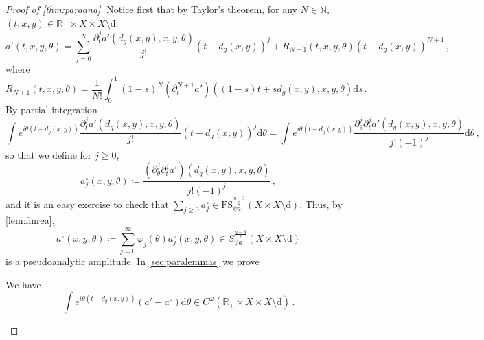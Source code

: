 \documentclass[
	fontsize=11pt, 
	twoside=false, 
	abstract=true, 
	a4paper,
]{scrartcl}
\newcommand{\RR}{\mathbb{R}}
\newcommand{\dd}{\mathrm{d}}
\newcommand{\del}{\partial}
\begin{document}
\begin{proof}[Proof of \cref{thm:paraana}]
	Notice first that by Taylor's theorem, for any $N\in\mathbb{N}$, $(t,x,y)\in \RR_+\times X\times X\setminus \mathrm{d}$, 
	\begin{equation}\label{eq:arterm}
		a'(t,x,y,\theta)%
		= %
		\sum_{j=0}^N\frac{\del_t^j a'(d_g(x,y),x,y,\theta)}{j!}(t-d_g(x,y))^j + R_{N+1}(t,x,y,\theta)(t-d_g(x,y))^{N+1}\,,%
	\end{equation}
	where
	\begin{equation}\label{eq:rterm}
		R_{N+1}(t,x,y,\theta) = \frac{1}{N!}\int_0^1 (1-s)^N (\del_t^{N+1} a')((1-s)t+sd_g(x,y),x,y,\theta) \dd s\,.
	\end{equation}
	By partial integration
	\[
		\int e^{i\theta(t-d_g(x,y))}  \frac{\del_t^j a'(d_g(x,y),x,y,\theta)}{j!}(t-d_g(x,y))^j\dd\theta = \int e^{i\theta(t-d_g(x,y))}  \frac{\del_\theta^j\del_t^j a'(d_g(x,y),x,y,\theta)}{j!(-1)^j}\dd\theta\,,
	\]
	so that we define for $j\geq 0$,
	\begin{equation}\label{eq:firstdiff}
		a_j^{\circ}(x,y,\theta) \coloneqq  \frac{(\del_\theta^j\del_t^ja')(d_g(x,y),x,y,\theta)}{j!(-1)^j}\,,
	\end{equation}
	and it is an easy exercise to check that $\sum_{j\geq 0} a_j^{\circ} \in \mathrm{FS}^{\frac{n-3}{2}}_{\psi a}(X\times X\setminus\mathrm{d})$. 
 	Thus, by \cref{lem:finrea}, 
	\[
		a^{\circ}(x,y,\theta) \coloneqq \sum_{j=0}^\infty \varphi_j(\theta)a^{\circ}_j(x,y,\theta) \in S^{\frac{n-3}{2}}_{\psi a}(X\times X\setminus\mathrm{d})
	\]
	is a pseudoanalytic amplitude. In \cref{sec:paralemmas} we prove
	\begin{lemma}\label{lem:replaceaprime}
		We have
		\[
			\int e^{i\theta(t-d_g(x,y))}(a'-a^{\circ})\dd\theta \in C^\omega(\RR_+\times X\times X\setminus \mathrm{d})\,.
		\]
	\end{lemma}

\end{proof}
\end{document}
